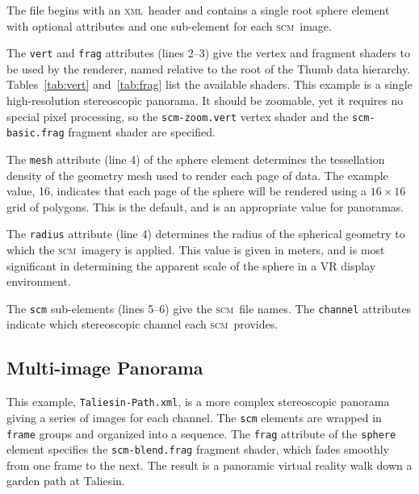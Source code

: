 \documentclass[oneside,10pt]{memoir}
\newcommand{\scm}     {\textsc{scm}}
\newcommand{\xml}     {\textsc{xml}}
\begin{document}
\begin{Spacing}{1.1}
The file begins with an \xml\ header and contains a single root sphere element with optional attributes and one sub-element for each \scm\ image.

The \texttt{vert} and \texttt{frag} attributes (lines 2--3) give the vertex and fragment shaders to be used by the renderer, named relative to the root of the Thumb data hierarchy. Tables~\ref{tab:vert} and~\ref{tab:frag} list the available shaders. This example is a single high-resolution stereoscopic panorama. It should be zoomable, yet it requires no special pixel processing, so the \texttt{scm-zoom.vert} vertex shader and the \texttt{scm-basic.frag} fragment shader are specified.

The \texttt{mesh} attribute (line 4) of the sphere element determines the tessellation density of the geometry mesh used to render each page of data. The example value, 16, indicates that each page of the sphere will be rendered using a $16\times 16$ grid of polygons. This is the default, and is an appropriate value for panoramas.

The \texttt{radius} attribute (line 4) determines the radius of the spherical geometry to which the \scm\ imagery is applied. This value is given in meters, and is most significant in determining the apparent scale of the sphere in a VR display environment.

The \texttt{scm} sub-elements (lines 5--6) give the \scm\ file names. The \texttt{channel} attributes indicate which stereoscopic channel each \scm\ provides.

\subsection{Multi-image Panorama}

This example, \texttt{Taliesin-Path.xml}, is a more complex stereoscopic panorama giving a series of images for each channel. The \texttt{scm} elements are wrapped in \texttt{frame} groups and organized into a sequence. The \texttt{frag} attribute of the \texttt{sphere} element specifies the \texttt{scm-blend.frag} fragment shader, which fades smoothly from one frame to the next. The result is a panoramic virtual reality walk down a garden path at Taliesin.


\end{Spacing}
\end{document}
